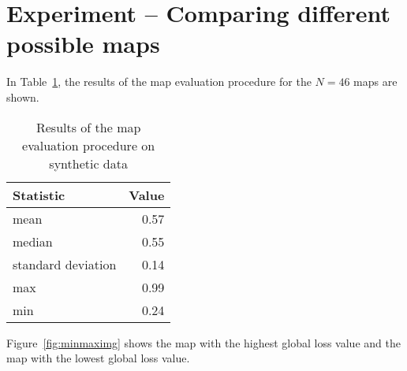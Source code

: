 \section{Experiment -- Comparing different possible maps}
\label{sec:experiment-maps}

In Table~\ref{tab:mapeval}, the results of the map evaluation
procedure for the $N = 46$ maps are shown.

\begin{table}[h]
  \centering
  \begin{tabular}{lr}
    \toprule
    Statistic & Value\\
    \midrule
    mean & 0.57\\
    median & 0.55\\
    standard deviation & 0.14\\
    max & 0.99\\
    min & 0.24\\    
    \bottomrule
  \end{tabular}
  \caption[Map evaluation procedure on synthetic data]{Results of the map evaluation procedure on synthetic data}
  \label{tab:mapeval}

\end{table}

Figure~\ref{fig:minmaximg} shows the map with the highest global loss value and the map with the lowest global loss value.